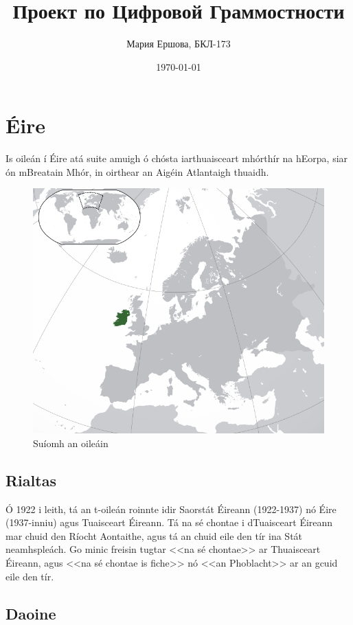 \documentclass[a4paper,12pt]{article}
\author{Мария Ершова, БКЛ-173}
\title{Проект по Цифровой Граммостности}
\date{\today}
\theoremstyle{plain} %
\theoremstyle{definition} %
\theoremstyle{remark} %
\begin{document}

\maketitle

\tableofcontents

\section{Éire}

Is oileán í Éire atá suite amuigh ó chósta iarthuaisceart mhórthír na hEorpa, siar ón mBreatain Mhór, in oirthear an Aigéin Atlantaigh thuaidh.

\begin{figure}[h!]
\centering
\includegraphics[width=0.6\linewidth]{Map_of_Ireland_in_Europe.png}
\caption{Suíomh an oileáin}
\end{figure}


\subsection{Rialtas}

Ó 1922 i leith, tá an t-oileán roinnte idir Saorstát Éireann (1922-1937) nó Éire (1937-inniu) agus Tuaisceart Éireann. Tá na sé chontae i dTuaisceart Éireann mar chuid den Ríocht Aontaithe, agus tá an chuid eile den tír ina Stát neamhspleách. Go minic freisin tugtar <<na sé chontae>> ar Thuaisceart Éireann, agus <<na sé chontae is fiche>> nó <<an Phoblacht>> ar an gcuid eile den tír.

\subsection{Daoine}
\end{document}
